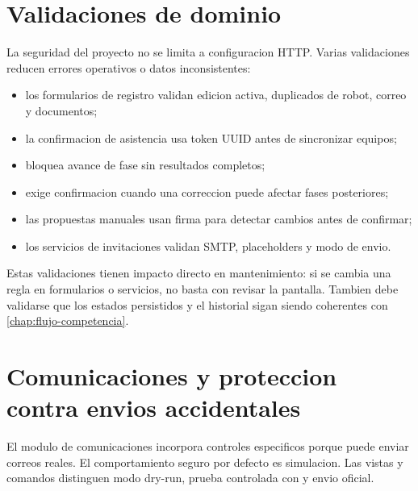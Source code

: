 \section{Validaciones de dominio}
\label{sec:seguridad-validaciones}

La seguridad del proyecto no se limita a configuracion HTTP. Varias validaciones reducen errores operativos o datos inconsistentes:

\begin{itemize}
  \item los formularios de registro validan edicion activa, duplicados de robot, correo y documentos;
  \item la confirmacion de asistencia usa token UUID antes de sincronizar equipos;
  \item {} bloquea avance de fase sin resultados completos;
  \item {} exige confirmacion cuando una correccion puede afectar fases posteriores;
  \item las propuestas manuales usan firma para detectar cambios antes de confirmar;
  \item los servicios de invitaciones validan SMTP, placeholders y modo de envio.
\end{itemize}

Estas validaciones tienen impacto directo en mantenimiento: si se cambia una regla en formularios o servicios, no basta con revisar la pantalla. Tambien debe validarse que los estados persistidos y el historial sigan siendo coherentes con \cref{chap:flujo-competencia}.

\section{Comunicaciones y proteccion contra envios accidentales}
\label{sec:seguridad-comunicaciones}

El modulo de comunicaciones incorpora controles especificos porque puede enviar correos reales. El comportamiento seguro por defecto es simulacion. Las vistas y comandos distinguen modo dry-run, prueba controlada con  y envio oficial.

